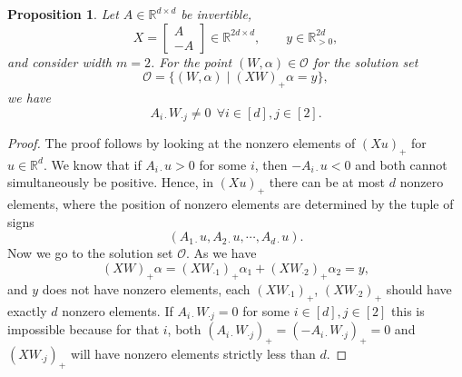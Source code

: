 \documentclass{article}
\newtheorem{proposition}{Proposition}[section]
\begin{document}
\begin{proposition} Let $A\in\mathbb{R}^{d\times d}$ be invertible,
\[
X=\begin{bmatrix}A\\-A\end{bmatrix}\in\mathbb{R}^{2d\times d},
\qquad
y\in\mathbb{R}^{2d}_{>0},
\]
and consider width $m=2$. For the point $(W,\alpha) \in \mathcal{O}$ for the solution set
\[
\mathcal{O}=\{(W,\alpha)\mid (XW)_+\alpha=y\},
\]
we have
\[
A_{i\cdot}W_{\cdot j} \neq 0\ \  \forall i \in [d], j \in [2].
\]
\label{prop1:barrier}
\end{proposition}
\begin{proof}
The proof follows by looking at the nonzero elements of $(Xu)_{+}$ for $u \in \mathbb{R}^{d}$. We know that if $A_{i\cdot}u> 0$ for some $i$, then $-A_{i\cdot}u < 0$ and both cannot simultaneously be positive. Hence, in $(Xu)_{+}$ there can be at most $d$ nonzero elements, where the position of nonzero elements are determined by the tuple of signs 
\[
(A_{1\cdot}u, A_{2\cdot}u, \cdots, A_{d \cdot}u).
\]
Now we go to the solution set $\mathcal{O}$. As we have
\[
(XW)_{+}\alpha = (XW_{\cdot 1})_{+}\alpha_1 + (XW_{\cdot 2})_{+}\alpha_2 = y,
\]
and $y$ does not have nonzero elements, each $(XW_{\cdot 1})_{+}$, $(XW_{\cdot 2})_{+}$ should have exactly $d$ nonzero elements. If $A_{i\cdot}W_{\cdot j} = 0$ for some $i \in [d], j \in [2]$ this is impossible because for that $i$, both $(A_{i\cdot}W_{\cdot j})_{+} = (-A_{i\cdot}W_{\cdot j})_{+} = 0$ and $(XW_{\cdot j})_{+}$ will have nonzero elements strictly less than $d$.
\end{proof}
\end{document}
